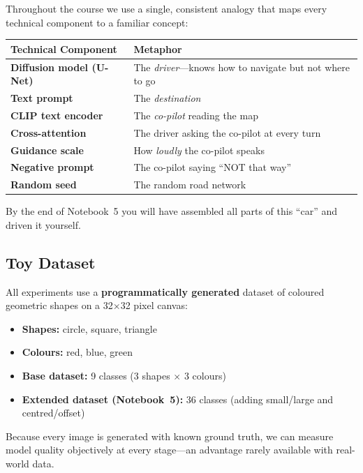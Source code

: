 \documentclass[11pt,a4paper]{article}
\begin{document}
Throughout the course we use a single, consistent analogy that maps every
technical component to a familiar concept:

\begin{center}
\renewcommand{\arraystretch}{1.3}
\begin{tabular}{>{\bfseries}l l}
\toprule
Technical Component & Metaphor \\
\midrule
Diffusion model (U-Net) & The \emph{driver}---knows how to navigate but not where to go \\
Text prompt & The \emph{destination} \\
CLIP text encoder & The \emph{co-pilot} reading the map \\
Cross-attention & The driver asking the co-pilot at every turn \\
Guidance scale & How \emph{loudly} the co-pilot speaks \\
Negative prompt & The co-pilot saying ``NOT that way'' \\
Random seed & The random road network \\
\bottomrule
\end{tabular}
\end{center}

By the end of Notebook~5 you will have assembled all parts of this
``car'' and driven it yourself.

\subsection{Toy Dataset}

All experiments use a \textbf{programmatically generated} dataset of
coloured geometric shapes on a 32$\times$32 pixel canvas:

\begin{itemize}[nosep]
  \item \textbf{Shapes:} circle, square, triangle
  \item \textbf{Colours:} red, blue, green
  \item \textbf{Base dataset:} 9 classes (3 shapes $\times$ 3 colours)
  \item \textbf{Extended dataset (Notebook~5):} 36 classes (adding
        small/large and centred/offset)
\end{itemize}

Because every image is generated with known ground truth, we can measure
model quality objectively at every stage---an advantage rarely available
with real-world data.


\end{document}
